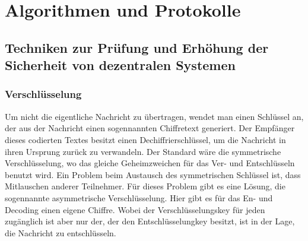 \documentclass[letterpaper, 12pt]{article}
\let\tempsection\section
\renewcommand\section[1]{\vspace{-0.3cm}\tempsection{#1}\vspace{-0.3cm}}
\let\tempsubsection\subsection
\renewcommand\subsection[1]{\vspace{0cm}\tempsubsection{#1}\vspace{0cm}}
\let\tempsubsubsection\subsubsection
\renewcommand\subsubsection[1]{\vspace{0cm}\tempsubsubsection{#1}\vspace{0cm}}
\begin{document}
\clearpage

\section{Algorithmen und Protokolle}

\subsection{Techniken zur Prüfung und Erhöhung der Sicherheit von dezentralen Systemen}

\subsubsection{Verschlüsselung}

Um nicht die eigentliche Nachricht zu übertragen, wendet man einen Schlüssel an, der aus
der Nachricht einen sogennannten Chiffretext generiert. Der Empfänger dieses codierten
Textes besitzt einen Dechiffrierschlüssel, um die Nachricht in ihren Ursprung zurück zu
verwandeln. Der Standard wäre die symmetrische Verschlüsselung, wo das gleiche
Geheimzweichen für das Ver- und Entschlüsseln benutzt wird. Ein Problem beim Austausch
des symmetrischen Schlüssel ist, dass Mitlauschen anderer Teilnehmer.
Für dieses Problem gibt es eine Lösung, die sogennannte asymmetrische Verschlüsselung.
Hier gibt es für das En- und Decoding einen eigene Chiffre. Wobei der Verschlüsselungskey
für jeden zugänglich ist aber nur der, der den Entschlüsselungkey besitzt, ist in der
Lage, die Nachricht zu entschlüsseln. \cite{ausarbeitungsec}
\end{document}
